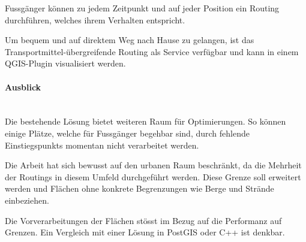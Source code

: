 Fussgänger können zu jedem Zeitpunkt und auf jeder Position ein Routing durchführen, welches ihrem Verhalten entspricht.


Um bequem und auf direktem Weg nach Hause zu gelangen, ist das Transportmittel-übergreifende Routing als Service verfügbar und kann in einem QGIS-Plugin visualisiert werden.


\paragraph{Ausblick}~\\
Die bestehende Lösung bietet weiteren Raum für Optimierungen. So können einige Plätze, welche für Fussgänger begehbar sind, durch fehlende \glspl{Einstiegspunkt} momentan nicht verarbeitet werden.

Die Arbeit hat sich bewusst auf den urbanen Raum beschränkt, da die Mehrheit der Routings in diesem Umfeld durchgeführt werden. Diese Grenze soll erweitert werden und Flächen ohne konkrete Begrenzungen wie Berge und Strände einbeziehen.

Die Vorverarbeitungen der Flächen stösst im Bezug auf die Performanz auf Grenzen. Ein Vergleich mit einer Lösung in PostGIS oder C++ ist denkbar.